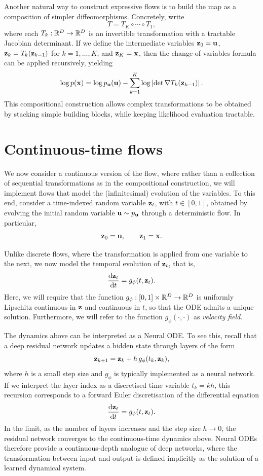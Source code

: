 Another natural way to construct expressive flows is to build the map as a
composition of simpler diffeomorphisms. Concretely, write
\[
T = T_K \circ \cdots \circ T_1,
\]
where each $T_k : {\mathbb R}^D \to {\mathbb R}^D$ is an invertible transformation with a
tractable Jacobian determinant. If we define the intermediate variables
${ \mathbf{z}}_0={ \mathbf{u}}$, ${ \mathbf{z}}_k = T_k({ \mathbf{z}}_{k-1})$ for $k=1,\ldots,K$, and ${ \mathbf{z}}_K={ \mathbf{x}}$, then the
change-of-variables formula can be applied recursively, yielding
\[
\log p({ \mathbf{x}})
=
\log p_{ \mathbf{u}}({ \mathbf{u}})
-
\sum_{k=1}^K
\log \left|\det \nabla T_k({ \mathbf{z}}_{k-1})\right|.
\]
This compositional construction allows complex transformations to be
obtained by stacking simple building blocks, while keeping likelihood
evaluation tractable.



\section{Continuous-time flows}

We now consider a continuous version of the flow, where rather than a collection of sequential transformations as in the compositional construction, we will implement flows that model the (infinitesimal) evolution of the variables. To this end, consider a time-indexed random variable ${ \mathbf{z}}_t$, with
$t\in[0,1]$, obtained by evolving the initial random variable
${ \mathbf{u}} \sim p_{ \mathbf{u}}$ through a deterministic flow. In particular,
\[
{ \mathbf{z}}_0 = { \mathbf{u}},
\qquad
{ \mathbf{z}}_1 = { \mathbf{x}} .
\]

Unlike discrete flows, where the transformation is applied from one variable to the next, we now model the temporal evolution of ${ \mathbf{z}}_t$, that is, 
\begin{equation}
    \label{eq:ODE}
    \frac{{\text{d}}{ \mathbf{z}}_t}{{\text{d}t}} = g_\phi(t,{ \mathbf{z}}_t).   
\end{equation}
 Here, we will require that the function $g_\phi: [0,1] \times {\mathbb R}^D \to {\mathbb R}^D$ is uniformly Lipschitz continuous in ${ \mathbf{z}}$ and continuous in $t$, so that the ODE admits a unique solution. Furthermore, we will refer to the function $g_\phi(\cdot,\cdot)$ as \emph{velocity field}.

\begin{remark}
The dynamics above can be interpreted as a Neural ODE. To see this, recall that a deep residual network updates a hidden state through layers of the form
\[
{ \mathbf{z}}_{k+1} = { \mathbf{z}}_k + h\, g_\phi(t_k, { \mathbf{z}}_k),
\]
where $h$ is a small step size and $g_\phi$ is typically implemented as a neural network. If we interpret the layer index as a discretised time variable $t_k = kh$, this recursion corresponds to a forward
Euler discretisation of the differential equation
\[
\frac{{\text{d}} { \mathbf{z}}_t}{{\text{d}} t} = g_\phi(t,{ \mathbf{z}}_t).
\]
In the limit, as the number of layers increases and the step size
$h\to0$, the residual network converges to the continuous-time
dynamics above. Neural ODEs \cite{chen2018neuralode} therefore provide a continuous-depth analogue of deep networks, where the transformation between input and output is defined implicitly as the solution of a learned dynamical
system.
\end{remark}

